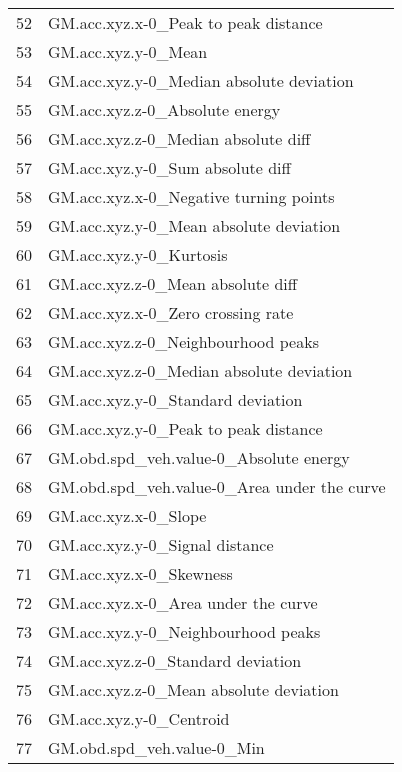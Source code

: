 \begin{tabular}{ll}
52  &              GM.acc.xyz.x-0\_Peak to peak distance \\
53  &                               GM.acc.xyz.y-0\_Mean \\
54  &          GM.acc.xyz.y-0\_Median absolute deviation \\
55  &                    GM.acc.xyz.z-0\_Absolute energy \\
56  &               GM.acc.xyz.z-0\_Median absolute diff \\
57  &                  GM.acc.xyz.y-0\_Sum absolute diff \\
58  &            GM.acc.xyz.x-0\_Negative turning points \\
59  &            GM.acc.xyz.y-0\_Mean absolute deviation \\
60  &                           GM.acc.xyz.y-0\_Kurtosis \\
61  &                 GM.acc.xyz.z-0\_Mean absolute diff \\
62  &                 GM.acc.xyz.x-0\_Zero crossing rate \\
63  &                GM.acc.xyz.z-0\_Neighbourhood peaks \\
64  &          GM.acc.xyz.z-0\_Median absolute deviation \\
65  &                 GM.acc.xyz.y-0\_Standard deviation \\
66  &              GM.acc.xyz.y-0\_Peak to peak distance \\
67  &            GM.obd.spd\_veh.value-0\_Absolute energy \\
68  &       GM.obd.spd\_veh.value-0\_Area under the curve \\
69  &                              GM.acc.xyz.x-0\_Slope \\
70  &                    GM.acc.xyz.y-0\_Signal distance \\
71  &                           GM.acc.xyz.x-0\_Skewness \\
72  &               GM.acc.xyz.x-0\_Area under the curve \\
73  &                GM.acc.xyz.y-0\_Neighbourhood peaks \\
74  &                 GM.acc.xyz.z-0\_Standard deviation \\
75  &            GM.acc.xyz.z-0\_Mean absolute deviation \\
76  &                           GM.acc.xyz.y-0\_Centroid \\
77  &                        GM.obd.spd\_veh.value-0\_Min \\

\end{tabular}
